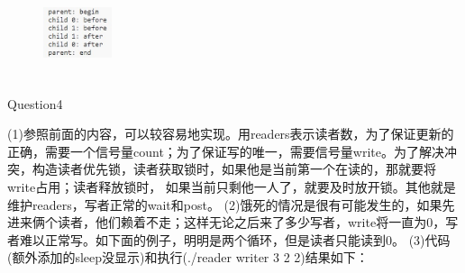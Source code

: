 \documentclass[12pt]{article}
\begin{document}
\begin{figure}[h]
    \centering
    \includegraphics[width=2cm,height=2.7cm]{hw9-6.jpg}
\end{figure}
\newpage
\begin{large}
    \noindent Question4\par
\end{large}
(1)参照前面的内容，可以较容易地实现。用readers表示读者数，为了保证更新的正确，需要一个信号量count；为了保证写的唯一，需要信号量write。为了解决冲突，构造读者优先锁，读者获取锁时，如果他是当前第一个在读的，那就要将write占用；读者释放锁时，
如果当前只剩他一人了，就要及时放开锁。其他就是维护readers，写者正常的wait和post。
(2)饿死的情况是很有可能发生的，如果先进来俩个读者，他们赖着不走；这样无论之后来了多少写者，write将一直为0，写者难以正常写。如下面的例子，明明是两个循环，但是读者只能读到0。
(3)代码(额外添加的sleep没显示)和执行(./reader writer 3 2 2)结果如下：
\begin{figure}[!h]
    \centering
    \hfill
\end{figure}
\end{document}
